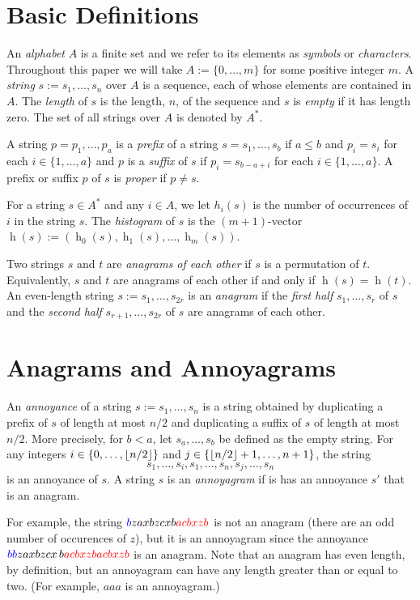 \documentclass[kpfonts]{patmorin}
\DeclareMathOperator{\hist}{h}
\newcommand{\colored}[2]{{\color{#1}#2}}
\begin{document}
\section{Basic Definitions}

An \emph{alphabet} $A$ is a finite set and we refer to its elements as \emph{symbols} or \emph{characters}.  Throughout this paper we will take $A:=\{0,\ldots,m\}$ for some positive integer $m$.  A \emph{string} $s:=s_1,\ldots,s_n$ over $A$ is a sequence, each of whose elements are contained in $A$.  The \emph{length} of $s$ is the length, $n$, of the sequence and $s$ is \emph{empty} if it has length zero.  The set of all strings over $A$ is denoted by $A^*$.

A string $p=p_1,\ldots,p_a$ is a \emph{prefix} of a string $s=s_1,\ldots,s_b$ if $a\le b$ and $p_i=s_i$ for each $i\in\{1,\ldots,a\}$ and $p$ is a \emph{suffix} of $s$ if $p_i=s_{b-a+i}$ for each $i\in\{1,\ldots,a\}$. A  prefix or suffix $p$ of $s$ is \emph{proper} if $p\neq s$.

For a string $s\in A^*$ and any $i\in A$, we let $h_i(s)$ is the number of occurrences of $i$ in the string $s$.  The \emph{histogram} of $s$ is the $(m+1)$-vector $\hist(s):=(\hist_0(s),\hist_1(s),\ldots,\hist_m(s))$.

Two strings $s$ and $t$ are \emph{anagrams of each other} if $s$ is a permutation of $t$.  Equivalently, $s$ and $t$ are anagrams of each other if and only if $\hist(s)=\hist(t)$.  An even-length string $s:=s_1,\ldots,s_{2r}$ is an \emph{anagram} if the \emph{first half} $s_1,\ldots,s_r$ of $s$ and the \emph{second half} $s_{r+1},\ldots,s_{2r}$ of $s$ are anagrams of each other.

\section{Anagrams and Annoyagrams}

An \emph{annoyance} of a string $s:=s_1,\ldots,s_n$ is a string obtained by duplicating a prefix of $s$ of length at most $n/2$ and duplicating a suffix of $s$ of length at most $n/2$.  More precisely, for $b <a$, let $s_a,\ldots,s_b$ be defined as the empty string.  For any integers $i\in\{0,\ldots,{\lfloor n/2 \rfloor}\}$ and $j\in\{{\lfloor n/2 \rfloor}+1,\ldots,n+1\}$, the string
\[
    s_1,\ldots,s_{i}, s_1,\ldots,s_n,s_{j},\ldots,s_n
\]
is an annoyance of $s$. A string $s$ is an \emph{annoyagram} if is has an annoyance $s'$ that is an anagram.

For example, the string $\colored{blue}{b}zaxbzcxb\colored{red}{acbxzb}$ is not an anagram (there are an odd number of occurences of $z$), but it is an annoyagram since the annoyance $\colored{blue}{bb}zaxbzcx\,b\colored{red}{acbxzb acbxzb}$ is an anagram.  Note that an anagram has even length, by definition, but an annoyagram can have any length greater than or equal to two. (For example, $aaa$ is an annoyagram.)
\end{document}
